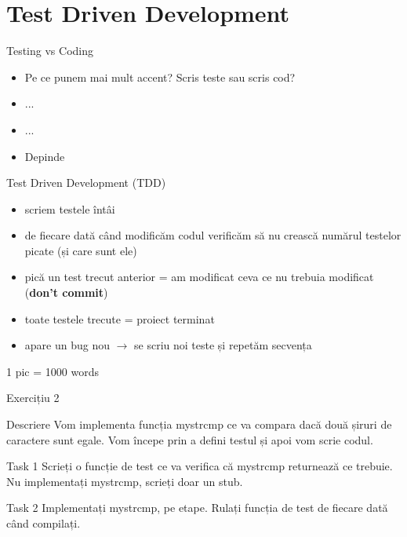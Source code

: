 \documentclass{beamer}
\begin{document}
\section{Test Driven Development}

\begin{frame}{Testing vs Coding}
  \begin{itemize}[<+->]
    \item Pe ce punem mai mult accent? Scris teste sau scris cod?
    \item ...
    \item ...
    \item Depinde
  \end{itemize}
\end{frame}

\begin{frame}{Test Driven Development (TDD)}
  \begin{itemize}[<+->]
    \item scriem testele întâi
    \item de fiecare dată când modificăm codul verificăm să nu crească numărul
    testelor picate (și care sunt ele)
    \item pică un test trecut anterior = am modificat ceva ce nu trebuia
    modificat (\textbf{don't commit})
    \item toate testele trecute = proiect terminat
    \item apare un bug nou $\rightarrow$ se scriu noi teste și repetăm
    secvența
  \end{itemize}
\end{frame}

\begin{frame}{1 pic = 1000 words}
\end{frame}

\begin{frame}{Exercițiu 2}
  \begin{block}{Descriere}
    Vom implementa funcția mystrcmp ce va compara dacă două șiruri de
    caractere sunt egale. Vom începe prin a defini testul și apoi vom scrie
    codul.
  \end{block}
  \begin{block}{Task 1}
    Scrieți o funcție de test ce va verifica că mystrcmp returnează ce
    trebuie. Nu implementați mystrcmp, scrieți doar un stub.
  \end{block}
  \pause
  \begin{block}{Task 2}
    Implementați mystrcmp, pe etape. Rulați funcția de test de fiecare dată
    când compilați.
  \end{block}
\end{frame}
\end{document}
